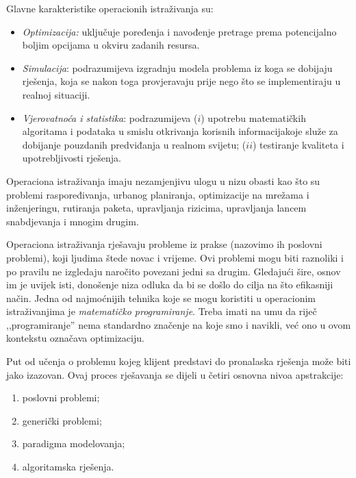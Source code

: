 \documentclass[a4paper, utf8, 11pt, colorlinks]{book}
\theoremstyle{definition}
\begin{document}
Glavne karakteristike operacionih istraživanja su:
\begin{itemize}
     \item \emph{Optimizacija:} %
       uključuje poređenja i navođenje pretrage prema potencijalno boljim opcijama u okviru zadanih resursa.
     \item \emph{Simulacija}:  podrazumijeva izgradnju modela problema iz koga se dobijaju rješenja, koja se nakon toga provjeravaju prije nego što se implementiraju u realnoj situaciji.
     \item \emph{Vjerovatnoća i statistika}:  podrazumijeva ($i$) upotrebu matematičkih algoritama i podataka u smislu otkrivanja korisnih informacijakoje služe za dobijanje pouzdanih predviđanja u realnom svijetu; ($ii$) testiranje kvaliteta i upotrebljivosti rješenja.
\end{itemize}
 
 Operaciona istraživanja imaju nezamjenjivu ulogu u nizu obasti kao što su problemi raspoređivanja, urbanog planiranja, optimizacije na mrežama i inženjeringu, rutiranja paketa, upravljanja rizicima, upravljanja lancem snabdjevanja i mnogim drugim. 

 Operaciona istraživanja rješavaju probleme iz prakse (nazovimo ih poslovni problemi), koji ljudima štede novac i vrijeme. Ovi problemi mogu biti raznoliki i po pravilu ne izgledaju naročito povezani jedni sa drugim. Gledajući šire, osnov  im je uvijek isti, donošenje niza odluka da bi se došlo do cilja na što efikasniji način.
Jedna od najmoćnijih tehnika koje se mogu koristiti u operacionim istraživanjima je \emph{matematičko programiranje}. Treba imati na umu da riječ  ,,programiranje'' nema standardno značenje na koje smo i navikli, već ono u ovom kontekstu označava optimizaciju.   %

  Put od učenja o problemu kojeg klijent predstavi do pronalaska rješenja može biti jako izazovan. Ovaj proces rješavanja se  dijeli u četiri osnovna nivoa apstrakcije:
  \begin{enumerate}
      \item poslovni problemi;
      \item generički problemi; 
      \item paradigma modelovanja;
      \item algoritamska rješenja. 
  \end{enumerate}
  
\end{document}
